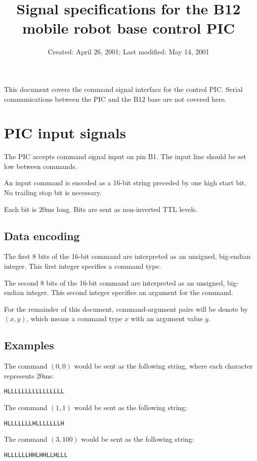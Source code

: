 \documentclass[12pt]{article}
\begin{document}
\title{Signal specifications for the B12 mobile robot base control PIC}
\date{Created: April 26, 2001;  Last modified: May 14, 2001}

\maketitle

This document covers the command signal interface for the control PIC\@.  Serial communications between the PIC and the B12 base are not covered here.


\section{PIC input signals}
The PIC accepts command signal input on pin B1.  The input line should be set low between commands.

An input command is encoded as a 16-bit string preceded by one high start bit.  No trailing stop bit is necessary.  

Each bit is 20ms long. Bits are sent as non-inverted TTL levels.

\subsection{Data encoding}
The first 8 bits of the 16-bit command are interpreted as an unsigned, big-endian integer.  This first integer specifies a command type.

The second 8 bits of the 16-bit command are interpreted as an unsigned, big-endian integer.  This second integer specifies an argument for the command.

For the remainder of this document, command-argument pairs will be denote by $(x,y)$, which means a command type $x$ with an argument value $y$.


\subsection{Examples}
The command $(0,0)$ would be sent as the following string, where each character represents 20ms:
\begin{center}
{\tt HLLLLLLLLLLLLLLLL }
\end{center}
The command $(1,1)$ would be sent as the following string:
\begin{center}
{\tt HLLLLLLLHLLLLLLLH }
\end{center}
The command $(3, 100)$ would be sent as the following string:
\begin{center}
{\tt HLLLLLLHHLHHLLHLLL }
\end{center}
\end{document}
